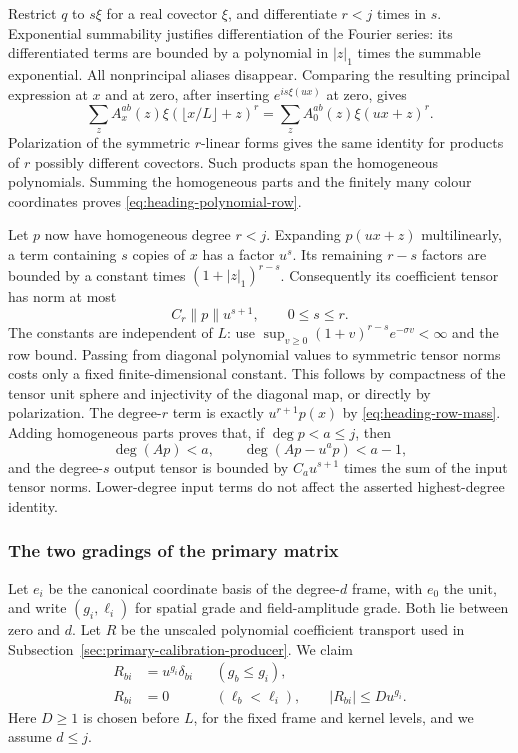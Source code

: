 Restrict $q$ to $s\xi$ for a real covector $\xi$, and differentiate
$r<j$ times in $s$. Exponential summability justifies differentiation
of the Fourier series: its differentiated terms are bounded by a
polynomial in $|z|_1$ times the summable exponential. All nonprincipal
aliases disappear. Comparing the resulting principal expression at
$x$ and at zero, after inserting $e^{is\xi(ux)}$ at zero, gives
\[
 \sum_z A_x^{ab}(z)\xi(\lfloor x/L\rfloor+z)^r
       =\sum_z A_0^{ab}(z)\xi(ux+z)^r.
\]
Polarization of the symmetric $r$-linear forms gives the same identity
for products of $r$ possibly different covectors. Such products span
the homogeneous polynomials. Summing the homogeneous parts and the
finitely many colour coordinates proves
\eqref{eq:heading-polynomial-row}.

Let $p$ now have homogeneous degree $r<j$. Expanding $p(ux+z)$
multilinearly, a term containing $s$ copies of $x$ has a factor $u^s$.
Its remaining $r-s$ factors are bounded by a constant times
$(1+|z|_1)^{r-s}$. Consequently its coefficient tensor has norm at most
\[
 C_r\|p\|u^{s+1},\qquad 0\le s\le r.
\]
The constants are independent of $L$: use
$\sup_{v\ge0}(1+v)^{r-s}e^{-\sigma v}<\infty$ and the row bound.
Passing from diagonal polynomial values to symmetric tensor norms
costs only a fixed finite-dimensional constant. This follows by
compactness of the tensor unit sphere and injectivity of the diagonal
map, or directly by polarization. The degree-$r$ term is exactly
$u^{r+1}p(x)$ by \eqref{eq:heading-row-mass}. Adding homogeneous
parts proves that, if $\deg p<a\le j$, then
\begin{equation}\label{eq:heading-polynomial-leading}
 \deg(Ap)<a,\qquad \deg(Ap-u^a p)<a-1,
\end{equation}
and the degree-$s$ output tensor is bounded by
$C_a u^{s+1}$ times the sum of the input tensor norms.
Lower-degree input terms do not affect the asserted highest-degree
identity.

\subsubsection{The two gradings of the primary matrix}
Let $e_i$ be the canonical coordinate basis of the degree-$d$ frame,
with $e_0$ the unit, and write $(g_i,\ell_i)$ for spatial grade and
field-amplitude grade. Both lie between zero and $d$. Let $R$ be the
unscaled polynomial coefficient transport used in
Subsection~\ref{sec:primary-calibration-producer}. We claim
\begin{align}
 R_{bi}&=u^{g_i}\delta_{bi} &&(g_b\le g_i),
                          \label{eq:heading-triangular-receipt}\\
 R_{bi}&=0 &&(\ell_b<\ell_i),\qquad
 |R_{bi}|\le D u^{g_i}.    \label{eq:heading-receipt-price}
\end{align}
Here $D\ge1$ is chosen before $L$, for the fixed frame and kernel
levels, and we assume $d\le j$.

